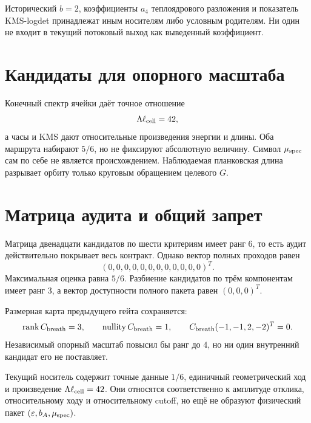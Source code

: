 Исторический $b=2$, коэффициенты $a_4$ теплоядрового разложения и показатель
KMS-logdet принадлежат иным носителям либо условным родителям. Ни один не
входит в текущий потоковый выход как выведенный коэффициент.

\section{Кандидаты для опорного масштаба}

Конечный спектр ячейки даёт точное отношение
\begin{equation}
 \Lambda\ell_{\rm cell}=42,
 \label{eq:v10-breathing-audit-cutoff-product}
\end{equation}
а часы и KMS дают относительные произведения энергии и длины. Оба маршрута
набирают $5/6$, но не фиксируют абсолютную величину. Символ
$\mu_{\rm spec}$ сам по себе не является происхождением. Наблюдаемая
планковская длина разрывает орбиту только круговым обращением целевого $G$.

\section{Матрица аудита и общий запрет}

Матрица двенадцати кандидатов по шести критериям имеет ранг $6$, то есть
аудит действительно покрывает весь контракт. Однако вектор полных проходов
равен
\begin{equation}
 (0,0,0,0,0,0,0,0,0,0,0,0)^T.
 \label{eq:v10-breathing-audit-pass-vector}
\end{equation}
Максимальная оценка равна $5/6$. Разбиение кандидатов по трём компонентам
имеет ранг $3$, а вектор доступности полного пакета равен $(0,0,0)^T$.

Размерная карта предыдущего гейта сохраняется:
\begin{equation}
 \operatorname{rank} C_{\rm breath}=3,
 \qquad
 \operatorname{nullity}C_{\rm breath}=1,
 \qquad
 C_{\rm breath}(-1,-1,2,-2)^T=0.
 \label{eq:v10-breathing-audit-scale-kernel}
\end{equation}
Независимый опорный масштаб повысил бы ранг до $4$, но ни один внутренний
кандидат его не поставляет.

\begin{theorem}
Текущий носитель содержит точные данные $1/6$, единичный геометрический ход
и произведение $\Lambda\ell_{\rm cell}=42$. Они относятся соответственно к
амплитуде отклика, относительному ходу и относительному cutoff, но ещё не
образуют физический пакет $(\varepsilon,b_A,\mu_{\rm spec})$.
\end{theorem}


